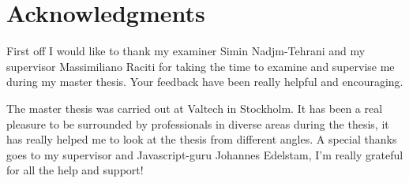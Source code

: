 \chapter*{Acknowledgments}

\thispagestyle{empty}

First off I would like to thank my examiner Simin Nadjm-Tehrani and my supervisor Massimiliano Raciti for taking the time to examine and supervise me during my master thesis. Your feedback have been really helpful and encouraging.  

The master thesis was carried out at Valtech in Stockholm. It has been a real pleasure to be surrounded by professionals in diverse areas during the thesis, it has really helped me to look at the thesis from different angles. A special thanks goes to my supervisor and Javascript-guru Johannes Edelstam, I'm really grateful for all the help and support!

